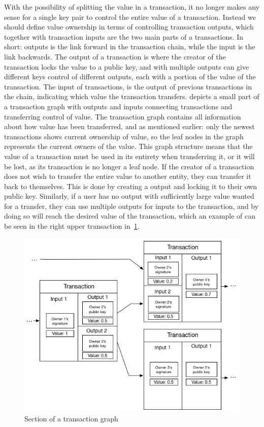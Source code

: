 With the possibility of splitting the value in a transaction, it no longer makes any sense for a single key pair to control the entire value of a transaction. Instead we should define value ownership in terms of controlling transaction outputs, which together with transaction inputs are the two main parts of a transactions. In short: outputs is the link forward in the transaction chain, while the input is the link backwards. The output of a transaction is where the creator of the transaction locks the value to a public key, and with multiple outputs can give different keys control of different outputs, each with a portion of the value of the transaction. The input of transactions, is the output of previous transactions in the chain, indicating which value the transaction transfers.  depicts a small part of a transaction graph with outputs and inputs connecting transactions and transferring control of value. The transaction graph contains all information about how value has been transferred, and as mentioned earlier: only the newest transactions shows current ownership of value, so the leaf nodes in the graph represents the current owners of the value.
This graph structure means that the value of a transaction must be used in its entirety when transferring it, or it will be lost, as its transaction is no longer a leaf node. If the creator of a transaction does not wish to transfer the entire value to another entity, they can transfer it back to themselves. This is done by creating a output and locking it to their own public key. Similarly, if a user has no output with sufficiently large value wanted for a transfer, they can use multiple outputs for inputs to the transaction, and by doing so will reach the desired value of the transaction, which an example of can be seen in the right upper transaction in~\cref{fig:transaction_graph}.


\begin{figure}[h]  %
  \centering
  \includegraphics[width=.7\textwidth]{figures/transaction}
  \caption{Section of a transaction graph}
  \label{fig:transaction_graph}
\end{figure}


